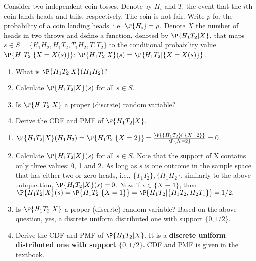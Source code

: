 \begin{exercise}\label{ex:chap03:02} 
	Consider two independent coin tosses. Denote by $H_i$ and $T_i$ the event that the $i$th coin lands heads and tails, respectively. The coin is not fair. Write $p$ for the probability of a coin landing heads, i.e. $\P{H_i} = p$. Denote $X$ the number of heads in two throws and define a function, denoted by $\P{H_1T_2|X}$, that maps $s \in S = \{H_1H_2, H_1T_2, T_1H_2, T_1T_2\}$ to the conditional probability value $\P{H_1T_2|\{X = X(s)\}}$: $\P{H_1T_2|X}(s)=\P{H_1T_2|\{X = X(s)\}}$.
	\begin{enumerate}
		\item What is $\P{H_1T_2|X}(H_1H_2)$?
		\item Calculate $\P{H_1T_2|X}(s)$ for all $s\in S$.
		\item Is $\P{H_1T_2|X}$ a proper (discrete) random variable?
		\item Derive the CDF and PMF of $\P{H_1T_2|X}$.
	\end{enumerate} 
	\begin{solution}
			\begin{enumerate}
			\item   $\P{H_1T_2|X}(H_1H_2)=\P{H_1T_2|\{X=2\}}= \frac{\P{\{H_1T_2\}\cap \{X=2\}}}{\P{X=2}}=0$.
			\item Calculate $\P{H_1T_2|X}(s)$ for all $s\in S$. Note that the support of X contains only three values: 0, 1 and 2. As long as $s$ is one outcome in the sample space that has either two or zero heads, i.e., $\{T_1T_2\},\{H_1H_2\}$, similarly to the above subquestion, $\P{H_1T_2|X}(s)=0$. Now if $s\in \{X=1\}$, then $\P{H_1T_2|X}(s)= \P{H_1T_2|\{X=1\}}= \P{H_1T_2|\{H_1T_2, H_2T_1\}}=1/2.$
			\item Is $\P{H_1T_2|X}$ a proper (discrete) random variable? Based on the above question, yes, a discrete uniform distributed one with support $\{0,1/2\}$.
			\item Derive the CDF and PMF of $\P{H_1T_2|X}$. It is a \textbf{discrete uniform distributed one with support $\{0,1/2\}$.} CDF and PMF is given in the textbook.
		\end{enumerate} 
	\end{solution}
\end{exercise}
 
